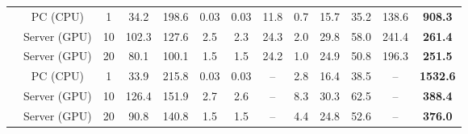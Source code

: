 \begin{table}[h]
{\begin{tabular}{c|cc|cc|cccc|cccc}
    \rowcolor[HTML]{E7E6E6} 
    \cellcolor[HTML]{FFFFFF}                                 & PC (CPU)        & 1                      & 34.2  & 198.6 & 0.03     & 0.03          & 11.8 & 0.7  & 15.7   & 35.2   & 138.6          & \textbf{908.3}     \\ \cmidrule{2-13} 
    \rowcolor[HTML]{FFFFFF} 
    \cellcolor[HTML]{FFFFFF}                                 & Server (GPU)    & 10                     & 102.3 & 127.6 & 2.5      & 2.3           & 24.3 & 2.0  & 29.8   & 58.0   & 241.4          & \textbf{261.4}     \\ \cmidrule{2-13} 
    \rowcolor[HTML]{FFFFFF} 
    \multirow{-3}{*}{\cellcolor[HTML]{FFFFFF}Antmaze}        & Server (GPU)    & 20                     & 80.1  & 100.1 & 1.5      & 1.5           & 24.2 & 1.0  & 24.9   & 50.8   & 196.3          & \textbf{251.5}     \\ \midrule
    \rowcolor[HTML]{E7E6E6} 
    \cellcolor[HTML]{FFFFFF}                                 & PC (CPU)        & 1                      & 33.9  & 215.8 & 0.03     & 0.03          & --   & 2.8  & 16.4   & 38.5   & --             & \textbf{1532.6}    \\ \cmidrule{2-13} 
    \rowcolor[HTML]{FFFFFF} 
    \cellcolor[HTML]{FFFFFF}                                 & Server (GPU)    & 10                     & 126.4 & 151.9 & 2.7      & 2.6           & --   & 8.3  & 30.3   & 62.5   & --             & \textbf{388.4}     \\ \cmidrule{2-13} 
    \rowcolor[HTML]{FFFFFF} 
    \multirow{-3}{*}{\cellcolor[HTML]{FFFFFF}Maze2D}         & Server (GPU)    & 20                     & 90.8  & 140.8 & 1.5      & 1.5           & --   & 4.4  & 24.8   & 52.6   & --             & \textbf{376.0}     \\ \midrule
    \end{tabular}
}
\end{table}
